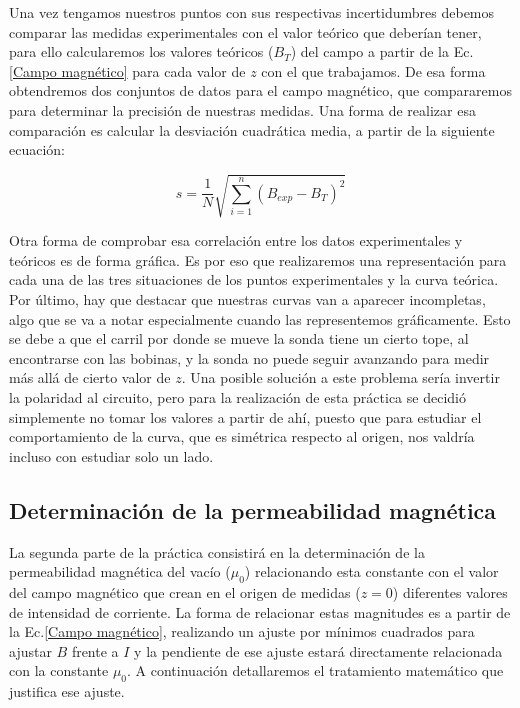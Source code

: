 \documentclass[a4paper,12pt,titlepage]{report}
\begin{document}
Una vez tengamos nuestros puntos con sus respectivas incertidumbres debemos comparar las medidas experimentales con el valor teórico que deberían tener, para ello calcularemos los valores teóricos ($B_T$) del campo a partir de la Ec.\ref{Campo magnético} para cada valor de $z$ con el que trabajamos. De esa forma obtendremos dos conjuntos de datos para el campo magnético, que compararemos para determinar la precisión de nuestras medidas. Una forma de realizar esa comparación es calcular la desviación cuadrática media, a partir de la siguiente ecuación:

\begin{equation}
    s = \frac{1}{N} \sqrt{\sum_{i=1}^{n} (B_{exp} - B_T)^2}
    \label{Desviación cuadrática media}
\end{equation}

Otra forma de comprobar esa correlación entre los datos experimentales y teóricos es de forma gráfica. Es por eso que realizaremos una representación para cada una de las tres situaciones de los puntos experimentales y la curva teórica. Por último, hay que destacar que nuestras curvas van a aparecer incompletas, algo que se va a notar especialmente cuando las representemos gráficamente. Esto se debe a que el carril por donde se mueve la sonda tiene un cierto tope, al encontrarse con las bobinas, y la sonda no puede seguir avanzando para medir más allá de cierto valor de $z$. Una posible solución a este problema sería invertir la polaridad al circuito, pero para la realización de esta práctica se decidió simplemente no tomar los valores a partir de ahí, puesto que para estudiar el comportamiento de la curva, que es simétrica respecto al origen, nos valdría incluso con estudiar solo un lado.

\newpage

\subsection{Determinación de la permeabilidad magnética}

La segunda parte de la práctica consistirá en la determinación de la permeabilidad magnética del vacío ($\mu_0$) relacionando esta constante con el valor del campo magnético que crean en el origen de medidas ($z=0$) diferentes valores de intensidad de corriente. La forma de relacionar estas magnitudes es a partir de la Ec.\ref{Campo magnético}, realizando un ajuste por mínimos cuadrados para ajustar $B$ frente a $I$ y la pendiente de ese ajuste estará directamente relacionada con la constante $\mu_0$. A continuación detallaremos el tratamiento matemático que justifica ese ajuste.
\end{document}
